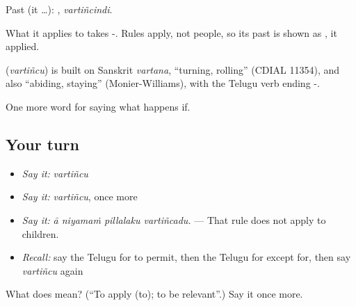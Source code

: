 Past (it …): , \emph{vartiñcindi}.

What it applies to takes -. Rules apply, not people, so its past is shown as , it applied.

\begin{cousinweb}
\textbf{} (\emph{vartiñcu}) is built on Sanskrit \emph{vartana}, \textquotedblleft{}turning, rolling\textquotedblright{} (CDIAL 11354), and also \textquotedblleft{}abiding, staying\textquotedblright{} (Monier-Williams), with the Telugu verb ending -.
\end{cousinweb}

\begin{grammarlens}[title={What you've built}]
One more word for saying what happens if.
\end{grammarlens}

\subsection*{Your turn}
\begin{itemize}
\raggedright
  \item \emph{Say it:} \emph{vartiñcu}
  \item \emph{Say it:} \emph{vartiñcu}, once more
  \item \emph{Say it:} \emph{ā niyamaṁ pillalaku vartiñcadu.} — That rule does not apply to children.
  \item \emph{Recall:} say the Telugu for to permit, then the Telugu for except for, then say \emph{vartiñcu} again
\end{itemize}

\begin{tcolorbox}[breakable,colback=teal!4,colframe=teal!35!black,title={Before you move on}]
What does  mean? (\textquotedblleft{}To apply (to); to be relevant\textquotedblright{}.) Say it once more.
\end{tcolorbox}
